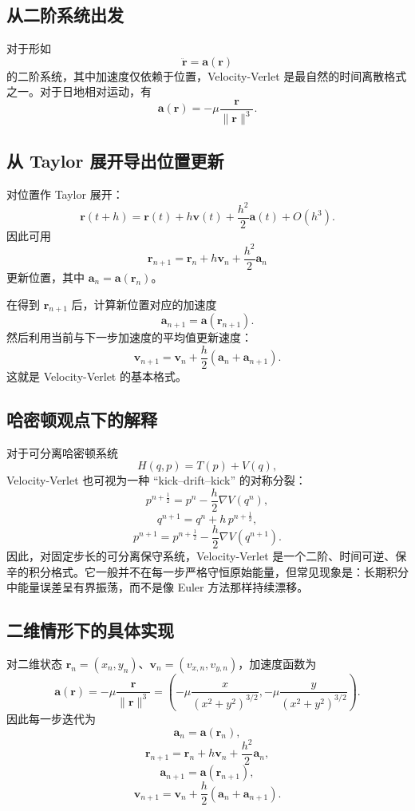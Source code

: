 \documentclass[12pt,a4paper]{ctexrep}
\begin{document}
\subsection{从二阶系统出发}

对于形如
\[
\ddot{\bm r}=\bm a(\bm r)
\]
的二阶系统，其中加速度仅依赖于位置，Velocity-Verlet 是最自然的时间离散格式之一。对于日地相对运动，有
\[
\bm a(\bm r)=-\mu \frac{\bm r}{\|\bm r\|^3}.
\]

\subsection{从 Taylor 展开导出位置更新}

对位置作 Taylor 展开：
\[
\bm r(t+h)=\bm r(t)+h\bm v(t)+\frac{h^2}{2}\bm a(t)+O(h^3).
\]
因此可用
\begin{equation}\label{eq:vv-r}
\bm r_{n+1}=\bm r_n+h\bm v_n+\frac{h^2}{2}\bm a_n
\end{equation}
更新位置，其中 \(\bm a_n=\bm a(\bm r_n)\)。

在得到 \(\bm r_{n+1}\) 后，计算新位置对应的加速度
\[
\bm a_{n+1}=\bm a(\bm r_{n+1}).
\]
然后利用当前与下一步加速度的平均值更新速度：
\begin{equation}\label{eq:vv-v}
\bm v_{n+1}=\bm v_n+\frac{h}{2}(\bm a_n+\bm a_{n+1}).
\end{equation}
这就是 Velocity-Verlet 的基本格式。

\subsection{哈密顿观点下的解释}

对于可分离哈密顿系统
\[
H(q,p)=T(p)+V(q),
\]
Velocity-Verlet 也可视为一种 ``kick--drift--kick'' 的对称分裂：
\[
p^{n+\frac12}=p^n-\frac{h}{2}\nabla V(q^n),
\]
\[
q^{n+1}=q^n+h\,p^{n+\frac12},
\]
\[
p^{n+1}=p^{n+\frac12}-\frac{h}{2}\nabla V(q^{n+1}).
\]
因此，对固定步长的可分离保守系统，Velocity-Verlet 是一个二阶、时间可逆、保辛的积分格式。它一般并不在每一步严格守恒原始能量，但常见现象是：长期积分中能量误差呈有界振荡，而不是像 Euler 方法那样持续漂移。

\subsection{二维情形下的具体实现}

对二维状态 \(\bm r_n=(x_n,y_n)\)、\(\bm v_n=(v_{x,n},v_{y,n})\)，加速度函数为
\[
\bm a(\bm r)=
-\mu \frac{\bm r}{\|\bm r\|^3}
=
\left(
-\mu \frac{x}{(x^2+y^2)^{3/2}},
-\mu \frac{y}{(x^2+y^2)^{3/2}}
\right).
\]
因此每一步迭代为
\[
\bm a_n=\bm a(\bm r_n),
\]
\[
\bm r_{n+1}=\bm r_n+h\bm v_n+\frac{h^2}{2}\bm a_n,
\]
\[
\bm a_{n+1}=\bm a(\bm r_{n+1}),
\]
\[
\bm v_{n+1}=\bm v_n+\frac{h}{2}(\bm a_n+\bm a_{n+1}).
\]
\end{document}
